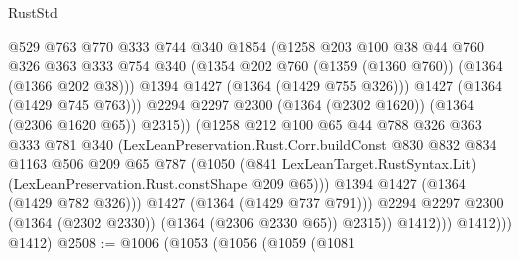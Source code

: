 \begin{lexlean}{RustStd}
\begin{coremodule}
                              @529
                              @763
                              @770
                              @333
                              @744
                              @340
                              @1854
                              (@1258
                                @203
                                @100
                                @38
                                @44
                                @760
                                @326
                                @363
                                @333
                                @754
                                @340
                                (@1354 @202 @760 (@1359 (@1360 @760)) (@1364 (@1366 @202 @38)))
                                @1394
                                @1427
                                (@1364 (@1429 @755 @326)))
                              @1427
                              (@1364 (@1429 @745 @763)))
                            @2294
                            @2297
                            @2300
                            (@1364 (@2302 @1620))
                            (@1364 (@2306 @1620 @65))
                            @2315))
                        (@1258
                          @212
                          @100
                          @65
                          @44
                          @788
                          @326
                          @363
                          @333
                          @781
                          @340
                          (LexLeanPreservation.Rust.Corr.buildConst
                            @830
                            @832
                            @834
                            @1163
                            @506
                            @209
                            @65
                            @787
                            (@1050
                              (@841 LexLeanTarget.RustSyntax.Lit)
                              (LexLeanPreservation.Rust.constShape @209 @65)))
                          @1394
                          @1427
                          (@1364 (@1429 @782 @326)))
                        @1427
                        (@1364 (@1429 @737 @791)))
                      @2294
                      @2297
                      @2300
                      (@1364 (@2302 @2330))
                      (@1364 (@2306 @2330 @65))
                      @2315))
                  @1412)))
            @1412)))
      @1412)
@2508 := @1006
    (@1053
      (@1056
        (@1059
          (@1081

\end{coremodule}
\end{lexlean}
